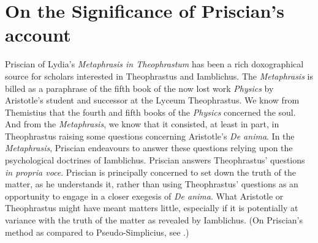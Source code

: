 \documentclass[12pt]{article}
\title{\mytitle}
\author{\myauthor}
\date{} %
\begin{document}
\maketitle
\begin{abstract} %
\noindent An \emph{aporia} posed by Theophrastus prompts Priscian to describe the process by which perception formally assimilates to its object as a progressive perfection. I present an interpretation of Priscian's account of perception's progressive perfection. And I consider a dilemma for the general class of accounts to which Priscian's belongs based on related problems raised by Plotinus and Aquinas.
\end{abstract}

\setlength{\parindent}{1em}


\section{On the Significance of Priscian's account} %
\label{sec:on_the_significance_of_priscian_s_account}

Priscian of Lydia's \emph{Metaphrasis in Theophrastum} has been a rich doxographical source for scholars interested in Theophrastus and Iamblichus. The \emph{Metaphrasis} is billed as a paraphrase of the fifth book of the now lost work \emph{Physics} by Aristotle's student and successor at the Lyceum Theophrastus. We know from Themistius that the fourth and fifth books of the \emph{Physics} concerned the soul. And from the \emph{Metaphrasis}, we know that it consisted, at least in part, in Theophrastus raising some questions concerning Aristotle's \emph{De anima}. In the \emph{Metaphrasis}, Priscian endeavours to answer these questions relying upon the psychological doctrines of Iamblichus. Priscian answers Theophrastus' questions \emph{in propria voce}. Priscian is principally concerned to set down the truth of the matter, as he understands it, rather than using Theophrastus' questions as an opportunity to engage in a closer exegesis of \emph{De anima}. What Aristotle or Theophrastus might have meant matters little, especially if it is potentially at variance with the truth of the matter as revealed by Iamblichus. (On Priscian's method as compared to Pseudo-Simplicius, see \citealt[7--10]{Steel:1978th}.)
\end{document}

